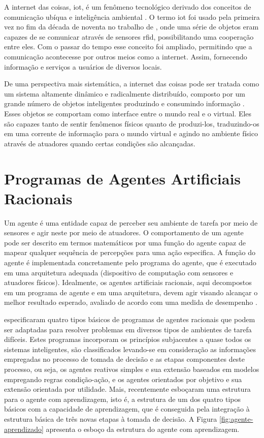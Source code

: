     A internet das coisas, \acrfull{iot}, é um fenômeno tecnológico derivado dos conceitos de comunicação ubíqua e inteligência ambiental \cite{dohr2010internet}. O termo \acrlong{iot} foi usado pela primeira vez no fim da década de noventa no trabalho de , onde uma série de objetos eram capazes de se comunicar através de sensores \acrshort{rfid}, possibilitando uma cooperação entre eles. Com o passar do tempo esse conceito foi ampliado, permitindo que a comunicação acontecesse por outros meios como a internet. Assim, fornecendo informação e serviços a usuários de diversos locais.
    
    De uma perspectiva mais sistemática, a internet das coisas pode ser tratada como um sistema altamente dinâmico e radicalmente distribuído, composto por um grande número de objetos inteligentes produzindo e consumindo informação \cite{miorandi2012internet}.  Esses objetos se comportam como interface entre o mundo real e o virtual. Eles são capazes tanto de sentir fenômenos físicos quanto de produzi-los, traduzindo-os em uma corrente de informação para o mundo virtual e agindo no ambiente físico através de atuadores quando certas condições são alcançadas. 

\section{Programas de Agentes Artificiais Racionais}
\label{sec:agentes}

    Um agente é uma entidade capaz de perceber seu ambiente de tarefa por meio de sensores e agir neste por meio de atuadores. O comportamento de um agente pode ser descrito em termos matemáticos por uma função do agente capaz de mapear qualquer sequência de percepções para uma ação especifica. A função do agente é implementada concretamente pelo programa do agente, que é executado em uma arquitetura adequada (dispositivo de computação com sensores e atuadores físicos). Idealmente, os agentes artificiais racionais, aqui decompostos em um programa de agente e em uma arquitetura, devem agir visando alcançar o melhor resultado esperado, avaliado de acordo com uma medida de desempenho \cite{norvig2004inteligencia}.
    
     especificaram quatro tipos básicos de programas de agentes racionais que podem ser adaptadas para resolver problemas em diversos tipos de ambientes de tarefa difíceis. Estes programas incorporam os princípios subjacentes a quase todos os sistemas inteligentes, são classificados levando-se em consideração as informações empregadas no processo de tomada de decisão e as etapas componentes deste processo, ou seja, os agentes reativos simples e sua extensão baseados em modelos empregando regras condição-ação, e os agentes orientados por objetivo e sua extensão orientada por utilidade. Mais, recentemente esboçaram uma estrutura para o agente com aprendizagem, isto é, a estrutura de um dos quatro tipos básicos com a capacidade de aprendizagem, que é conseguida pela integração à estrutura básica de três novas etapas à tomada de decisão. A Figura \ref{fig:agente-aprendizado} apresenta o esboço da estrutura do agente com aprendizagem.

